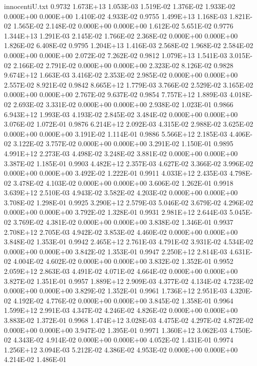 \begin{filecontents}{innocentiU.txt}
0.9732 1.673E+13 1.053E-03 1.519E-02 1.376E-02 1.933E-02 0.000E+00 0.000E+00 1.410E-02 4.933E-02
0.9755 1.499E+13 1.168E-03 1.821E-02 1.565E-02 2.148E-02 0.000E+00 0.000E+00 1.612E-02 5.651E-02
0.9776 1.344E+13 1.291E-03 2.145E-02 1.766E-02 2.368E-02 0.000E+00 0.000E+00 1.826E-02 6.408E-02
0.9795 1.204E+13 1.416E-03 2.568E-02 1.968E-02 2.584E-02 0.000E+00 0.000E+00 2.072E-02 7.262E-02
0.9812 1.079E+13 1.541E-03 3.015E-02 2.166E-02 2.791E-02 0.000E+00 0.000E+00 2.323E-02 8.126E-02
0.9828 9.674E+12 1.663E-03 3.416E-02 2.353E-02 2.985E-02 0.000E+00 0.000E+00 2.557E-02 8.921E-02
0.9842 8.665E+12 1.779E-03 3.766E-02 2.529E-02 3.165E-02 0.000E+00 0.000E+00 2.767E-02 9.637E-02
0.9854 7.757E+12 1.889E-03 4.018E-02 2.693E-02 3.331E-02 0.000E+00 0.000E+00 2.938E-02 1.023E-01
0.9866 6.943E+12 1.993E-03 4.193E-02 2.845E-02 3.484E-02 0.000E+00 0.000E+00 3.076E-02 1.072E-01
0.9876 6.214E+12 2.092E-03 4.315E-02 2.988E-02 3.625E-02 0.000E+00 0.000E+00 3.191E-02 1.114E-01
0.9886 5.566E+12 2.185E-03 4.406E-02 3.122E-02 3.757E-02 0.000E+00 0.000E+00 3.291E-02 1.150E-01
0.9895 4.991E+12 2.273E-03 4.498E-02 3.248E-02 3.881E-02 0.000E+00 0.000E+00 3.387E-02 1.185E-01
0.9903 4.482E+12 2.357E-03 4.627E-02 3.366E-02 3.996E-02 0.000E+00 0.000E+00 3.492E-02 1.222E-01
0.9911 4.033E+12 2.435E-03 4.798E-02 3.478E-02 4.103E-02 0.000E+00 0.000E+00 3.606E-02 1.262E-01
0.9918 3.639E+12 2.510E-03 4.943E-02 3.582E-02 4.203E-02 0.000E+00 0.000E+00 3.708E-02 1.298E-01
0.9925 3.290E+12 2.579E-03 5.046E-02 3.679E-02 4.296E-02 0.000E+00 0.000E+00 3.792E-02 1.328E-01
0.9931 2.981E+12 2.644E-03 5.045E-02 3.769E-02 4.381E-02 0.000E+00 0.000E+00 3.838E-02 1.346E-01
0.9937 2.708E+12 2.705E-03 4.942E-02 3.853E-02 4.460E-02 0.000E+00 0.000E+00 3.848E-02 1.353E-01
0.9942 2.465E+12 2.761E-03 4.791E-02 3.931E-02 4.534E-02 0.000E+00 0.000E+00 3.842E-02 1.353E-01
0.9947 2.250E+12 2.814E-03 4.631E-02 4.004E-02 4.602E-02 0.000E+00 0.000E+00 3.832E-02 1.352E-01
0.9952 2.059E+12 2.863E-03 4.491E-02 4.071E-02 4.664E-02 0.000E+00 0.000E+00 3.827E-02 1.351E-01
0.9957 1.889E+12 2.909E-03 4.377E-02 4.134E-02 4.723E-02 0.000E+00 0.000E+00 3.829E-02 1.352E-01
0.9961 1.736E+12 2.951E-03 4.320E-02 4.192E-02 4.776E-02 0.000E+00 0.000E+00 3.845E-02 1.358E-01
0.9964 1.599E+12 2.991E-03 4.347E-02 4.246E-02 4.826E-02 0.000E+00 0.000E+00 3.883E-02 1.372E-01
0.9968 1.474E+12 3.028E-03 4.475E-02 4.297E-02 4.872E-02 0.000E+00 0.000E+00 3.947E-02 1.395E-01
0.9971 1.360E+12 3.062E-03 4.750E-02 4.343E-02 4.914E-02 0.000E+00 0.000E+00 4.052E-02 1.431E-01
0.9974 1.256E+12 3.094E-03 5.212E-02 4.386E-02 4.953E-02 0.000E+00 0.000E+00 4.214E-02 1.486E-01

\end{filecontents}

